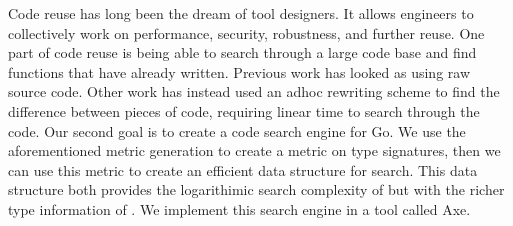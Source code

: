 Code reuse has long been the dream of tool designers.
It allows engineers to collectively work on performance, security, robustness, and further reuse.
One part of code reuse is being able to search through a large code base and find functions that have already written.
Previous work \cite{cox} has looked as using raw source code.
Other work \cite{mitchell:hoogle_16_may_2011} has instead used an adhoc rewriting scheme to find the difference between pieces of code,
requiring linear time to search through the code.
Our second goal is to create a code search engine for Go.
We use the aforementioned metric generation to create a metric on type signatures,
then we can use this metric to create an efficient data structure for search.
This data structure both provides the logarithimic search complexity of \cite{cox} but with the richer type information of \cite{mitchell:hoogle_16_may_2011}.
We implement this search engine in a tool called Axe.

